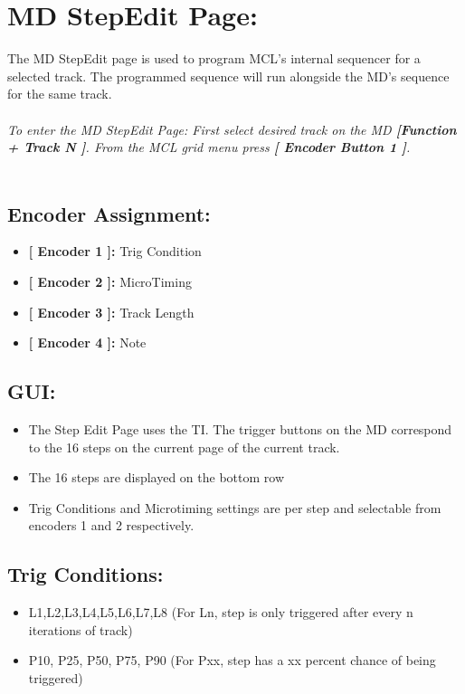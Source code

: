 \chapter{MD StepEdit Page:}

The MD StepEdit page is used to program MCL's  internal sequencer for a selected track. The programmed sequence will run alongside the MD's sequence for the same track.\\
\\\textit{To enter the MD StepEdit Page: First select desired track on the MD \textbf{[Function + Track N ]}. From the MCL grid menu press \textbf{[ Encoder Button 1 ]}.}\\
\\
\section{Encoder Assignment:}
\begin{itemize}
	\item \textbf{[ Encoder 1 ]: } Trig Condition
	\item \textbf{[ Encoder 2 ]: } MicroTiming
	\item \textbf{[ Encoder 3 ]: } Track Length
	\item \textbf{[ Encoder 4 ]: } Note
\end{itemize}
\section{GUI:}
\begin{itemize}
\item The Step Edit Page uses the TI. The trigger buttons on the MD correspond to the 16 steps on the current page of the current track.
\item The 16 steps are displayed on the bottom row
\item Trig Conditions and Microtiming settings are per step and selectable from encoders 1 and 2 respectively.
\end{itemize}
\section{Trig Conditions:}
\begin{itemize}
\item L1,L2,L3,L4,L5,L6,L7,L8 (For Ln, step is only triggered after every n iterations of track)
\item P10, P25, P50, P75, P90 (For Pxx, step has a xx percent chance of being triggered)
\end{itemize}
